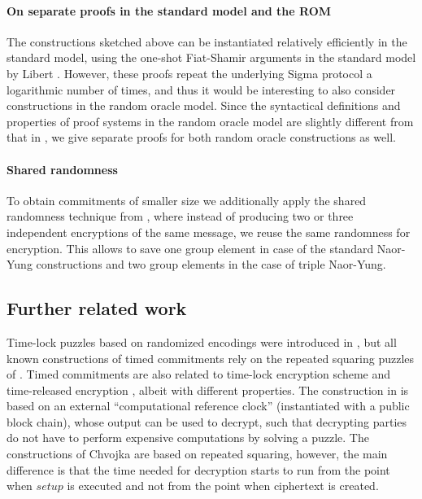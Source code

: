 \paragraph{On separate proofs in the standard model and the ROM}
The constructions sketched above can be instantiated relatively efficiently in the standard model, using the one-shot Fiat-Shamir arguments in the standard model by Libert \etal \cite{Libert2021OneShotFN}. However, these proofs repeat the underlying Sigma protocol a logarithmic number of times, and thus it would be interesting to also consider constructions in the random oracle model.
Since the syntactical definitions and properties of proof systems in the random oracle model are slightly different from that in \cite{Libert2021OneShotFN}, we give separate proofs for both random oracle constructions as well. 

\paragraph{Shared randomness} To obtain commitments of smaller size we additionally apply the shared randomness technique from \cite{SCN:BiaMasVen16}, where instead of producing two or three independent encryptions of the same message, we reuse the same randomness for encryption. This allows to save one group element in case of the standard Naor-Yung constructions and two group elements in the case of triple Naor-Yung.

\subsection{Further related work}
Time-lock puzzles based on randomized encodings were introduced in \cite{TCC:BDGM19}, but all known constructions of timed commitments rely on the repeated squaring puzzles of \cite{RSW96}.
Timed commitments are also related to time-lock encryption scheme \cite{liu2018build} and time-released encryption \cite{cryptoeprint:2020/739}, albeit with different properties. The construction in \cite{liu2018build} is based on an external ``computational reference clock'' (instantiated with a public block chain), whose output can be used to decrypt, such that decrypting parties do not have to perform expensive computations by solving a puzzle. The constructions of Chvojka \etal \cite{cryptoeprint:2020/739} are based on repeated squaring, however, the main difference is that the time needed for decryption starts to run from the point when $setup$ is executed and not from the point when ciphertext is created. 

